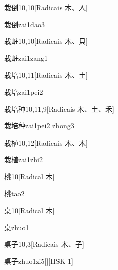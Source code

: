 \begin{entry}{栽倒}{10,10}[Radicais ⽊、⼈]
  \begin{phonetics}{栽倒}{zai1dao3}
  \end{phonetics}
\end{entry}

\begin{entry}{栽赃}{10,10}[Radicais ⽊、⾙]
  \begin{phonetics}{栽赃}{zai1zang1}
  \end{phonetics}
\end{entry}

\begin{entry}{栽培}{10,11}[Radicais ⽊、⼟]
  \begin{phonetics}{栽培}{zai1pei2}
  \end{phonetics}
\end{entry}

\begin{entry}{栽培种}{10,11,9}[Radicais ⽊、⼟、⽲]
  \begin{phonetics}{栽培种}{zai1pei2 zhong3}
  \end{phonetics}
\end{entry}

\begin{entry}{栽植}{10,12}[Radicais ⽊、⽊]
  \begin{phonetics}{栽植}{zai1zhi2}
  \end{phonetics}
\end{entry}

\begin{entry}{桃}{10}[Radical ⽊]
  \begin{phonetics}{桃}{tao2}
  \end{phonetics}
\end{entry}

\begin{entry}{桌}{10}[Radical ⽊]
  \begin{phonetics}{桌}{zhuo1}
  \end{phonetics}
\end{entry}

\begin{entry}{桌子}{10,3}[Radicais ⽊、⼦]
  \begin{phonetics}{桌子}{zhuo1zi5}[][HSK 1]
  \end{phonetics}
\end{entry}

